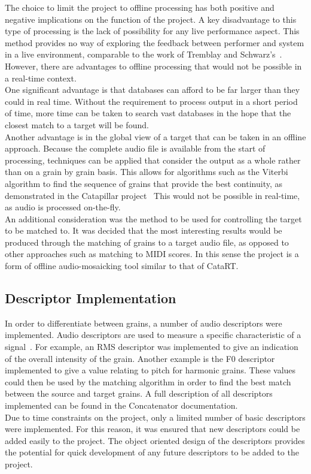 \documentclass[titlepage]{scrartcl}
\begin{document}
    The choice to limit the project to offline processing has both positive and
    negative implications on the function of the project. A key disadvantage to
    this type of processing is the lack of possibility for any live performance
    aspect. This method provides no way of exploring the feedback between
    performer and system in a live environment, comparable to the work of
    Tremblay and Schwarz's~\citeyearpar{Tremblay2010}.
    However, there are advantages to offline processing that would not be
    possible in a real-time context.\\
    One significant advantage is that databases can afford to be far larger
    than they could in real time. Without the requirement to process output in
    a short period of time, more time can be taken to search vast databases in
    the hope that the closest match to a target will be found.\\
    Another advantage is in the global view of a target that can be taken in an
    offline approach. Because the complete audio file is available from the
    start of processing, techniques can be applied that consider the output as
    a whole rather than on a grain by grain basis. This allows for algorithms
    such as the Viterbi algorithm to find the sequence of grains that provide
    the best continuity, as demonstrated in the Catapillar
    project~\parencite[p.4]{Schwarz2003} This would not be possible in
    real-time, as audio is processed on-the-fly.\\

    An additional consideration was the method to be used for controlling the
    target to be matched to. It was decided that the most interesting results
    would be produced through the matching of grains to a target audio file, as
    opposed to other approaches such as matching to MIDI scores. In this sense
    the project is a form of offline audio-mosaicking tool similar to that of
    CataRT.
    
    \subsection*{Descriptor Implementation}
    In order to differentiate between grains, a number of audio descriptors
    were implemented. Audio descriptors are used to measure a specific
    characteristic of a signal~\parencite[p.31]{Lerch2012}. For example, an RMS
    descriptor was implemented to give an indication of the overall intensity
    of the grain. Another example is the F0 descriptor implemented to give a
    value relating to pitch for harmonic grains. These values could then be
    used by the matching algorithm in order to find the best match between the
    source and target grains. A full description of all descriptors implemented
    can be found in the Concatenator documentation.\\
    Due to time constraints on the project, only a limited number of basic
    descriptors were implemented. For this reason, it was ensured that new
    descriptors could be added easily to the project. The object oriented
    design of the descriptors provides the potential for quick development of
    any future descriptors to be added to the project. 
\end{document}
